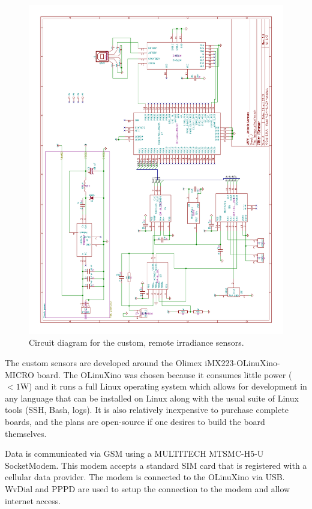 \begin{figure}
\includegraphics[angle=-90,width=\textwidth]{figs/circuit.pdf}
\caption[Custom sensor circuit diagram]{Circuit diagram for the
  custom, remote irradiance sensors.}
\label{fig:circuit}
\end{figure}

The custom sensors are developed around the Olimex
iMX223-OLinuXino-MICRO board.
The OLinuXino was chosen because it consumes little power ($< 1$W) and it
runs a full Linux operating system which allows for development in any
language that can be installed on Linux along with the usual suite of
Linux tools (SSH, Bash, logs).
It is also relatively inexpensive to purchase complete boards, and the
plans are open-source if one desires to build the board themselves.

Data is communicated via GSM using a MULTITECH MTSMC-H5-U SocketModem.
This modem accepts a standard SIM card that is registered with a
cellular data provider.
The modem is connected to the OLinuXino via USB.
WvDial and PPPD are used to setup the connection to the modem and
allow internet access.

